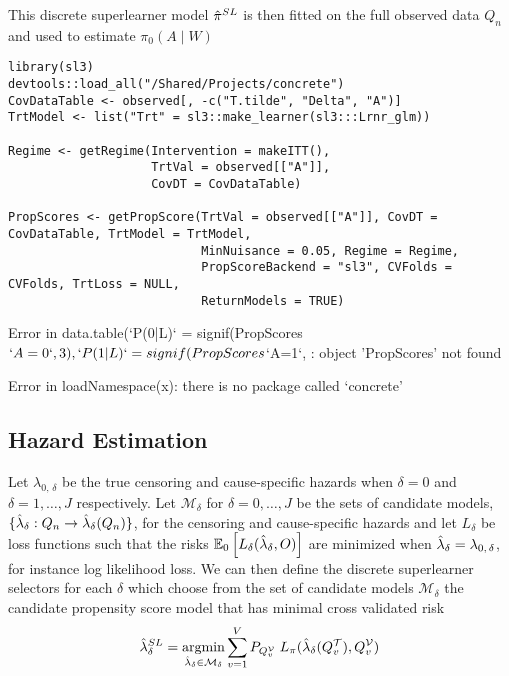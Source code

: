 \documentclass{report}
\newcommand{\1}{\ensuremath{\mathbf{1}}}
\DeclareMathOperator*{\argmin}{argmin}
\newcommand{\X}{\ensuremath{{W}}}
\newcommand{\g}{\ensuremath{\pi}}
\begin{document}
This discrete superlearner model \(\Hat{\g}^{SL}\) is then fitted on the full observed data \(Q_n\) and used to estimate \(\g_0(A \mid \X)\)


\begin{lstlisting}
library(sl3)
devtools::load_all("/Shared/Projects/concrete")
CovDataTable <- observed[, -c("T.tilde", "Delta", "A")]
TrtModel <- list("Trt" = sl3::make_learner(sl3:::Lrnr_glm))

Regime <- getRegime(Intervention = makeITT(),
                    TrtVal = observed[["A"]],
                    CovDT = CovDataTable)

PropScores <- getPropScore(TrtVal = observed[["A"]], CovDT = CovDataTable, TrtModel = TrtModel,
                           MinNuisance = 0.05, Regime = Regime,
                           PropScoreBackend = "sl3", CVFolds = CVFolds, TrtLoss = NULL, 
                           ReturnModels = TRUE)
\end{lstlisting}


Error in data.table(`P(0|L)` = signif(PropScores\(`A=0`, 3), `P(1|L)` = signif(PropScores\)`A=1`,  : 
  object 'PropScores' not found

Error in loadNamespace(x): there is no package called ‘concrete’

\subsection*{Hazard Estimation}
\label{sec:org38542cc}
Let \(\lambda_{0,\,\delta}\) be the true censoring and cause-specific hazards when \(\delta = 0\) and \(\delta = 1, \dots, J\) respectively. Let \(\mathcal{M}_\delta\) for \(\delta = 0, \dots, J\) be the sets of candidate models, \(\{\Hat{\lambda}_\delta : Q_n \to \Hat{\lambda}_\delta(Q_n)\}\), for the censoring and cause-specific hazards and let \(L_\delta\) be loss functions such that the risks \(\mathbb{E}_0\left[L_\delta(\Hat{\lambda}_\delta, O)\right]\) are minimized when \(\Hat{\lambda}_\delta = \lambda_{0,\,\delta}\), for instance log likelihood loss. We can then define the discrete superlearner selectors for each \(\delta\) which choose from the set of candidate models \(\mathcal{M_\delta}\) the candidate propensity score model that has minimal cross validated risk 
\[ \Hat{\lambda}_\delta^{SL} = \argmin_{\Hat{\lambda}_\delta \in \mathcal{M}_\delta} \sum_{v = 1}^{V} P_{Q^\mathcal{V}_v} \; L_\g(\Hat{\lambda}_\delta(Q^\mathcal{T}_v), Q^\mathcal{V}_v)\]
\end{document}

